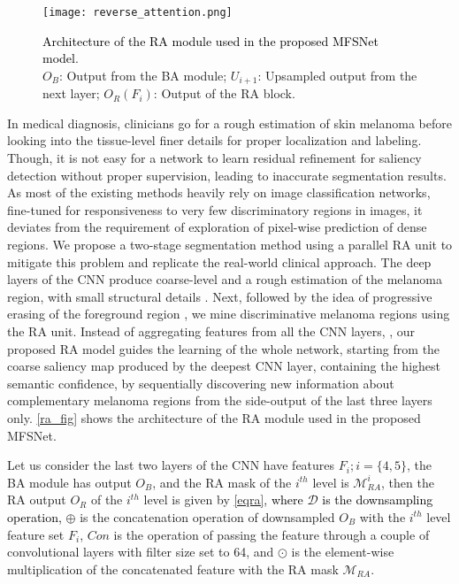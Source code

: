 \documentclass[review]{elsarticle}
\begin{document}
\begin{figure*}
    \centering
\texttt{[image: reverse\_attention.png]}
\caption{\textcolor{black}{Architecture of the RA module used in the proposed MFSNet model}.\\$O_B$: Output from the BA module; $U_{i+1}$: Upsampled output from the next layer; $O_R(F_i)$: Output of the RA block.}
    \label{ra_fig}
\end{figure*}

In medical diagnosis, clinicians go for a rough estimation of skin melanoma before looking into the tissue-level finer details for proper localization and labeling. Though, it is not easy for a network to learn residual refinement for saliency detection without proper supervision, leading to inaccurate segmentation results. As most of the existing methods heavily rely on image classification networks, fine-tuned for responsiveness to very few discriminatory regions in images, it deviates from the requirement of exploration of pixel-wise prediction of dense regions. We propose a two-stage segmentation method using a parallel RA unit to mitigate this problem and replicate the real-world clinical approach. The deep layers of the CNN produce coarse-level and a rough estimation of the melanoma region, with small structural details \cite{burdick2018rethinking}. Next, followed by the idea of progressive erasing of the foreground region \cite{wei2017object}, we mine discriminative melanoma regions using the RA unit. Instead of aggregating features from all the CNN layers, \cite{chen2018reverse}, our proposed RA model guides the learning of the whole network, starting from the coarse saliency map produced by the deepest CNN layer, containing the highest semantic confidence, by sequentially discovering new information about complementary melanoma regions from the side-output of the last three layers only. \autoref{ra_fig} shows the architecture of the RA module used in the proposed MFSNet.

Let us consider the last two layers of the CNN have features  $F_i; i=\{4,5\}$, the BA module has output $O_B$, and the RA mask of the $i^{th}$ level is $\mathcal{M}_{RA}^i$, then the RA output $O_{R}$ of the $i^{th}$ level is given by \autoref{eqra},\textcolor{black}{ where $\mathcal{D}$ is the downsampling operation,} $\oplus$ is the concatenation operation of downsampled $O_B$ with the $i^{th}$ level feature set $F_i$, $Con$ is the operation of passing the feature through a couple of convolutional layers with filter size set to 64, and $\odot$ is the element-wise multiplication of the concatenated feature with the RA mask $\mathcal{M}_{RA}$.
\end{document}
